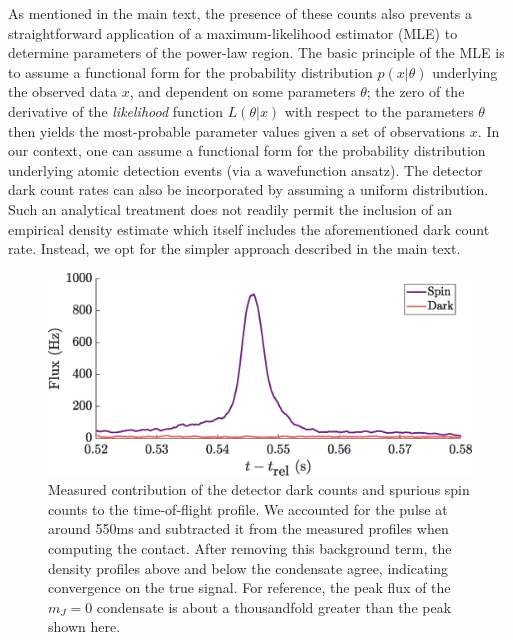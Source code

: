 	As mentioned in the main text, the presence of these counts also prevents a straightforward application of a maximum-likelihood estimator (MLE) to determine parameters of the power-law region. The basic principle of the MLE is to assume a functional form for the probability distribution $p(x|\theta)$ underlying the observed data $x$, and dependent on some parameters $\theta$; the zero of the derivative of the \emph{likelihood} function $L(\theta|x)$ with respect to the parameters $\theta$ then yields the most-probable parameter values given a set of observations $x$. In our context, one can assume a functional form for the probability distribution underlying atomic detection events (via a wavefunction ansatz). The detector dark count rates can also be incorporated by assuming a uniform distribution. Such an analytical treatment does not readily permit the inclusion of an empirical density estimate which itself includes the aforementioned dark count rate. Instead, we opt for the simpler approach described in the main text.

    \begin{figure}[!b]
	\begin{center}
		\includegraphics[width=\columnwidth]{fig/QD/spinpop}
		\caption{Measured contribution of the detector dark counts and spurious spin counts to the time-of-flight profile. We accounted for the pulse at around 550ms and subtracted it from the measured profiles when computing the contact. After removing this background term, the density profiles above and below the condensate agree, indicating convergence on the true signal. For reference, the peak flux of the $m_J=0$ condensate is about a thousandfold greater than the peak shown here.}
		\label{fig:spinpop}
	\end{center}
	\end{figure}





